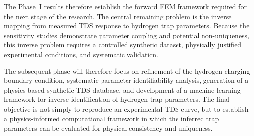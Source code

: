 \documentclass[a4paper,12pt,oneside]{report}
\begin{document}
The Phase~I results therefore establish the forward FEM framework required for the
next stage of the research. The central remaining problem is the inverse mapping from
measured TDS response to hydrogen trap parameters. Because the sensitivity studies
demonstrate parameter coupling and potential non-uniqueness, this inverse problem
requires a controlled synthetic dataset, physically justified experimental
conditions, and systematic validation.
 
The subsequent phase will therefore focus on refinement of the hydrogen charging
boundary condition, systematic parameter identifiability analysis, generation of
a physics-based synthetic TDS database, and development of a machine-learning
framework for inverse identification of hydrogen trap parameters. The final
objective is not simply to reproduce an experimental TDS curve, but to establish a
physics-informed computational framework in which the inferred trap parameters can
be evaluated for physical consistency and uniqueness.





\end{document}
